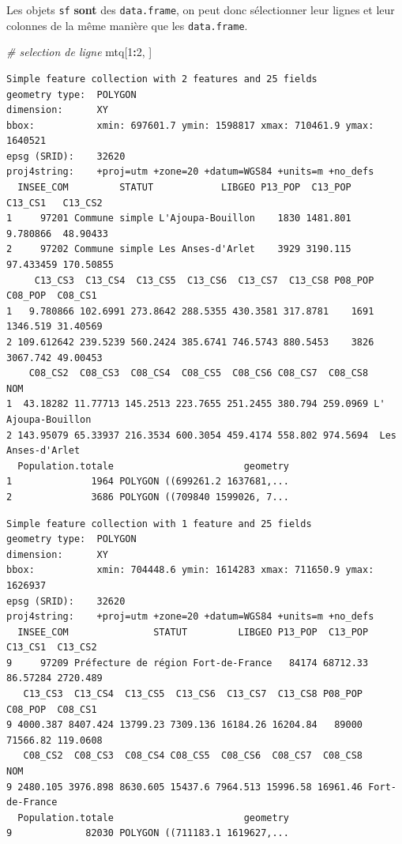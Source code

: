 \documentclass[]{book}
\newenvironment{Shaded}{\begin{snugshade}}{\end{snugshade}}
\newcommand{\DecValTok}[1]{\textcolor[rgb]{0.00,0.00,0.81}{#1}}
\newcommand{\StringTok}[1]{\textcolor[rgb]{0.31,0.60,0.02}{#1}}
\newcommand{\CommentTok}[1]{\textcolor[rgb]{0.56,0.35,0.01}{\textit{#1}}}
\newcommand{\OperatorTok}[1]{\textcolor[rgb]{0.81,0.36,0.00}{\textbf{#1}}}
\newcommand{\NormalTok}[1]{#1}
\begin{document}
Les objets \texttt{sf} \textbf{sont} des \texttt{data.frame}, on peut
donc sélectionner leur lignes et leur colonnes de la même manière que
les \texttt{data.frame}.

\begin{Shaded}
\begin{Highlighting}[]
\CommentTok{# selection de ligne}
\NormalTok{mtq[}\DecValTok{1}\OperatorTok{:}\DecValTok{2}\NormalTok{, ]}
\end{Highlighting}
\end{Shaded}

\begin{verbatim}
Simple feature collection with 2 features and 25 fields
geometry type:  POLYGON
dimension:      XY
bbox:           xmin: 697601.7 ymin: 1598817 xmax: 710461.9 ymax: 1640521
epsg (SRID):    32620
proj4string:    +proj=utm +zone=20 +datum=WGS84 +units=m +no_defs
  INSEE_COM         STATUT            LIBGEO P13_POP  C13_POP   C13_CS1   C13_CS2
1     97201 Commune simple L'Ajoupa-Bouillon    1830 1481.801  9.780866  48.90433
2     97202 Commune simple Les Anses-d'Arlet    3929 3190.115 97.433459 170.50855
     C13_CS3  C13_CS4  C13_CS5  C13_CS6  C13_CS7  C13_CS8 P08_POP  C08_POP  C08_CS1
1   9.780866 102.6991 273.8642 288.5355 430.3581 317.8781    1691 1346.519 31.40569
2 109.612642 239.5239 560.2424 385.6741 746.5743 880.5453    3826 3067.742 49.00453
    C08_CS2  C08_CS3  C08_CS4  C08_CS5  C08_CS6 C08_CS7  C08_CS8                NOM
1  43.18282 11.77713 145.2513 223.7655 251.2455 380.794 259.0969 L' Ajoupa-Bouillon
2 143.95079 65.33937 216.3534 600.3054 459.4174 558.802 974.5694  Les Anses-d'Arlet
  Population.totale                       geometry
1              1964 POLYGON ((699261.2 1637681,...
2              3686 POLYGON ((709840 1599026, 7...
\end{verbatim}

\begin{Shaded}
\end{Shaded}

\begin{verbatim}
Simple feature collection with 1 feature and 25 fields
geometry type:  POLYGON
dimension:      XY
bbox:           xmin: 704448.6 ymin: 1614283 xmax: 711650.9 ymax: 1626937
epsg (SRID):    32620
proj4string:    +proj=utm +zone=20 +datum=WGS84 +units=m +no_defs
  INSEE_COM               STATUT         LIBGEO P13_POP  C13_POP  C13_CS1  C13_CS2
9     97209 Préfecture de région Fort-de-France   84174 68712.33 86.57284 2720.489
   C13_CS3  C13_CS4  C13_CS5  C13_CS6  C13_CS7  C13_CS8 P08_POP  C08_POP  C08_CS1
9 4000.387 8407.424 13799.23 7309.136 16184.26 16204.84   89000 71566.82 119.0608
   C08_CS2  C08_CS3  C08_CS4 C08_CS5  C08_CS6  C08_CS7  C08_CS8            NOM
9 2480.105 3976.898 8630.605 15437.6 7964.513 15996.58 16961.46 Fort-de-France
  Population.totale                       geometry
9             82030 POLYGON ((711183.1 1619627,...
\end{verbatim}
\end{document}
